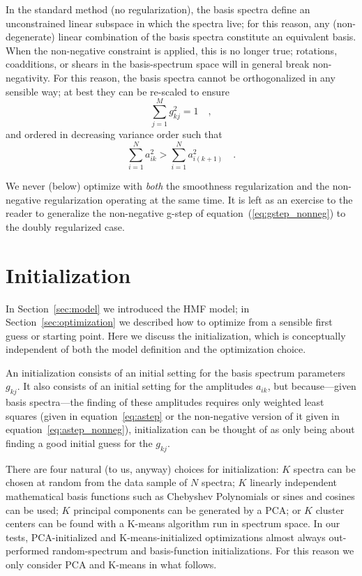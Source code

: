 \documentclass[12pt,preprint]{aastex}
\newcommand{\sectionname}{Section}
\newcommand{\equationname}{equation}
\begin{document}
In the standard method (no regularization), the basis spectra define
an unconstrained linear subspace in which the spectra live; for this
reason, any (non-degenerate) linear combination of the basis spectra
constitute an equivalent basis.  When the non-negative constraint is
applied, this is no longer true; rotations, coadditions, or shears in
the basis-spectrum space will in general break non-negativity.  For
this reason, the basis spectra cannot be orthogonalized in any
sensible way; at best they can be re-scaled to ensure
\begin{equation}\label{eq:nnnormalization}
\sum_{j=1}^{M}g_{kj}^2 = 1
\quad ,
\end{equation}
and ordered in decreasing variance order such that
\begin{equation}\label{eq:nnordering}
\sum_{i=1}^{N}a_{ik}^2>\sum_{i=1}^{N}a_{i(k+1)}^2
\quad .
\end{equation}

We never (below) optimize with \emph{both} the smoothness
regularization and the non-negative regularization operating at the
same time.  It is left as an exercise to the reader to generalize the
non-negative g-step of \equationname~(\ref{eq:gstep_nonneg}) to the
doubly regularized case.

\section{Initialization}\label{sec:initialization}

In \sectionname~\ref{sec:model} we introduced the HMF model; in
\sectionname~\ref{sec:optimization} we described how to optimize from
a sensible first guess or starting point.  Here we discuss the
initialization, which is conceptually independent of both the model
definition and the optimization choice.

An initialization consists of an initial setting for the basis
spectrum parameters $g_{kj}$.  It also consists of an initial setting
for the amplitudes $a_{ik}$, but because---given basis spectra---the
finding of these amplitudes requires only weighted least squares
(given in \equationname~\ref{eq:astep} or the non-negative version of
it given in \equationname~\ref{eq:astep_nonneg}), initialization can
be thought of as only being about finding a good initial guess for the
$g_{kj}$.

There are four natural (to us, anyway) choices for initialization: $K$
spectra can be chosen at random from the data sample of $N$ spectra;
$K$ linearly independent mathematical basis functions such as
Chebyshev Polynomials or sines and cosines can be used; $K$ principal
components can be generated by a PCA; or $K$ cluster centers can be
found with a K-means algorithm run in spectrum space.  In our tests,
PCA-initialized and K-means-initialized optimizations almost always
out-performed random-spectrum and basis-function initializations.  For
this reason we only consider PCA and K-means in what follows.
\end{document}
